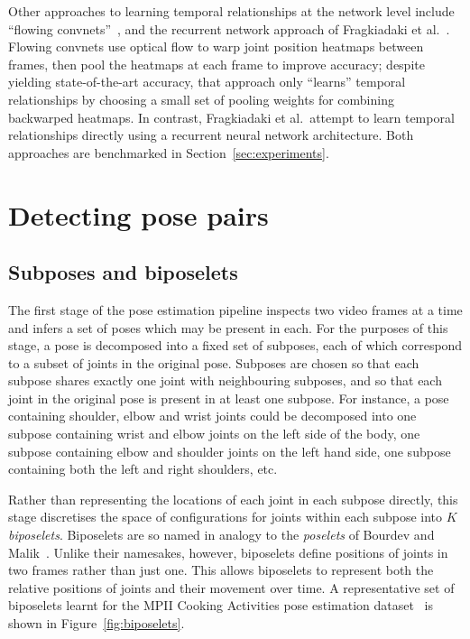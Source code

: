 \documentclass[runningheads]{llncs}
\begin{document}
Other approaches to learning temporal relationships at the network level include
``flowing convnets''~\cite{pfister2015flowing}, and the recurrent network
approach of Fragkiadaki et al.~\cite{fragkiadaki2015recurrent}. Flowing convnets
use optical flow to warp joint position heatmaps between frames, then pool the
heatmaps at each frame to improve accuracy; despite yielding state-of-the-art
accuracy, that approach only ``learns'' temporal relationships by choosing a
small set of pooling weights for combining backwarped heatmaps. In contrast,
Fragkiadaki et al.\ attempt to learn temporal relationships directly using a
recurrent neural network architecture. Both approaches are benchmarked in
Section~\ref{sec:experiments}.

\section{Detecting pose pairs}\label{sec:pair-dets}

\subsection{Subposes and biposelets}\label{sec:decomp}

The first stage of the pose estimation pipeline inspects two video frames at a
time and infers a set of poses which may be present in each. For the purposes of
this stage, a pose is decomposed into a fixed set of subposes, each of which
correspond to a subset of joints in the original pose. Subposes are chosen so
that each subpose shares exactly one joint with neighbouring subposes, and so
that each joint in the original pose is present in at least one subpose. For
instance, a pose containing shoulder, elbow and wrist joints could be decomposed
into one subpose containing wrist and elbow joints on the left side of the body,
one subpose containing elbow and shoulder joints on the left hand side, one
subpose containing both the left and right shoulders, etc.

Rather than representing the locations of each joint in each subpose directly,
this stage discretises the space of configurations for joints within each
subpose into $K$ \textit{biposelets}. Biposelets are so named in analogy to the
\textit{poselets} of Bourdev and Malik~\cite{bourdev2009poselets}. Unlike their
namesakes, however, biposelets define positions of joints in two frames rather
than just one. This allows biposelets to represent both the relative positions
of joints and their movement over time. A representative set of biposelets
learnt for the MPII Cooking Activities pose estimation
dataset~\cite{rohrbach2012database} is shown in Figure~\ref{fig:biposelets}.
\end{document}
